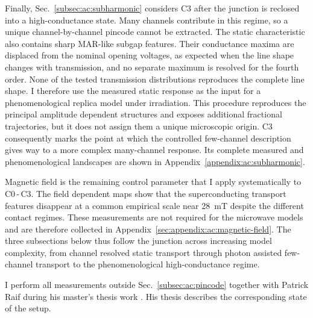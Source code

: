    Finally, Sec.~\ref{subsec:ac:subharmonic} considers C3 after the junction is reclosed into a high-conductance state. Many channels contribute in this regime, so a unique channel-by-channel pincode cannot be extracted. The static characteristic also contains sharp MAR-like subgap features. Their conductance maxima are displaced from the nominal opening voltages, as expected when the line shape changes with transmission, and no separate maximum is resolved for the fourth order. None of the tested transmission distributions reproduces the complete line shape. I therefore use the measured static response as the input for a phenomenological replica model under irradiation. This procedure reproduces the principal amplitude dependent structures and exposes additional fractional trajectories, but it does not assign them a unique microscopic origin. C3 consequently marks the point at which the controlled few-channel description gives way to a more complex many-channel response. Its complete measured and phenomenological landscapes are shown in Appendix~\ref{appendix:ac:subharmonic}.

    Magnetic field is the remaining control parameter that I apply systematically to C0\,-\,C3. The field dependent maps show that the superconducting transport features disappear at a common empirical scale near \qty{28}{\milli\tesla} despite the different contact regimes. These measurements are not required for the microwave models and are therefore collected in Appendix~\ref{sec:appendix:ac:magnetic-field}. The three subsections below thus follow the junction across increasing model complexity, from channel resolved static transport through photon assisted few-channel transport to the phenomenological high-conductance regime.

    I perform all measurements outside Sec.~\ref{subsec:ac:pincode} together with Patrick Raif during his master's thesis work \cite{raif_electronic_2024}. His thesis describes the corresponding state of the setup.
